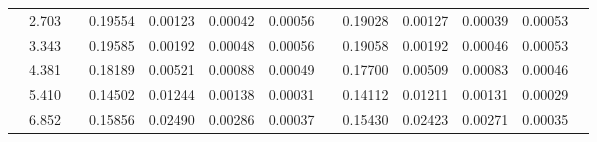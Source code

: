 \documentclass[aps,prc,superscriptaddress,showpacs,floatfix,twocolumn]{revtex4}
\begin{document}
\begin{table}[htbp]
\begin{ruledtabular}
\begin{tabular}{c|cccccccccccc}
 & 2.703 && 0.19554 & 0.00123 & 0.00042 & 0.00056 & & 0.19028 & 0.00127 & 0.00039 & 0.00053 \\ 
 & 3.343 && 0.19585 & 0.00192 & 0.00048 & 0.00056 & & 0.19058 & 0.00192 & 0.00046 & 0.00053 \\ 
 & 4.381 && 0.18189 & 0.00521 & 0.00088 & 0.00049 & & 0.17700 & 0.00509 & 0.00083 & 0.00046 \\ 
 & 5.410 && 0.14502 & 0.01244 & 0.00138 & 0.00031 & & 0.14112 & 0.01211 & 0.00131 & 0.00029 \\ 
 & 6.852 && 0.15856 & 0.02490 & 0.00286 & 0.00037 & & 0.15430 & 0.02423 & 0.00271 & 0.00035 \\ 
\end{tabular} \end{ruledtabular} \endgroup
\end{table}
\end{document}
